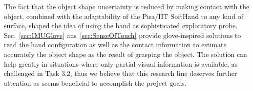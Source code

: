 \documentclass[a4paper,11pt,pdf]{pacmanreport}
\begin{document}
The fact that the object shape uncertainty is reduced by making contact with the object, combined with the adaptability of the Pisa/IIT SoftHand to any kind of surface, shaped the idea of using the hand as sophisticated exploratory probe. Sec.~\ref{sec:IMUGlove} ans~\ref{sec:SenseOfTouch} provide glove-inspired solutions to read the hand configuration as well as the contact information to estimate accurately the object shape as the result of grasping the object. The solution can help greatly in situations where only partial visual information is available, as challenged in Task 3.2, thus we believe that this research line deserves further attention as seems beneficial to accomplish the project goals.








% 




\end{document}
